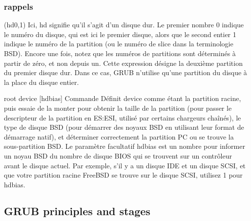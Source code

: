 \documentclass[10]{article}
\begin{document}
\subsubsection{rappels}
(hd0,1)
Ici, hd signifie qu'il s'agit d'un disque dur. Le premier nombre 0 indique le num\'ero du disque, qui est ici le premier disque, alors que le second entier 1 indique le num\'ero de la partition (ou le num\'ero de slice dans la terminologie BSD). Encore une fois, notez que les num\'eros de partitions sont d\'etermin\'es \`a partir de z\'ero, et non depuis un. Cette expression d\'esigne la deuxi\`eme partition du premier disque dur. Dans ce cas, GRUB n'utilise qu'une partition du disque \`a la place du disque entier.  

root device [hdbias] 	Commande
D\'efinit device comme \'etant la partition racine, puis essaie de la monter pour obtenir la taille de la partition (pour passer le descripteur de la partition en ES:ESI, utilis\'e par certains chargeurs chaîn\'es), le type de disque BSD (pour d\'emarrer des noyaux BSD en utilisant leur format de d\'emarrage natif), et d\'eterminer correctement la partition PC ou se trouve la sous-partition BSD. Le param\`etre facultatif hdbias est un nombre pour informer un noyau BSD du nombre de disque BIOS qui se trouvent sur un contrôleur avant le disque actuel. Par exemple, s'il y a un disque IDE et un disque SCSI, et que votre partition racine FreeBSD se trouve sur le disque SCSI, utilisez 1 pour hdbias. 

\subsection{GRUB principles and stages}
\end{document}
